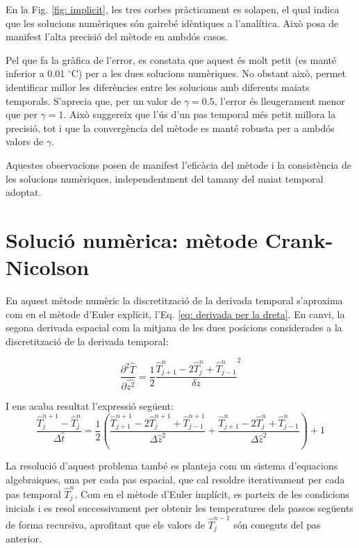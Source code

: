 \documentclass[11pt]{article}
\begin{document}
En la Fig. \ref{fig: implicit}, les tres corbes pràcticament es solapen, el qual indica que les solucions numèriques són gairebé idèntiques a l'analítica. Això posa de manifest l'alta precisió del mètode en ambdós casos.

Pel que fa la gràfica de l'error, es constata que aquest és molt petit (es manté inferior a 0.01 $^\circ$C) per a les dues solucions numèriques. No obstant això, permet identificar millor les diferències entre les solucions amb diferents maiats temporals. S'aprecia que, per un valor de $\gamma = 0.5$, l'error és lleugerament menor que per $\gamma = 1$. Això suggereix que l'ús d'un pas temporal més petit millora la precisió, tot i que la convergència del mètode es manté robusta per a ambdós valors de $\gamma$.

Aquestes observacions posen de manifest l'eficàcia del mètode i la consistència de les solucions numèriques, independentment del tamany del maiat temporal adoptat.


\section{Solució numèrica: mètode Crank-Nicolson}

En aquest mètode numèric la discretització de la derivada temporal s'aproxima com en el mètode d'Euler explícit, l'Eq. \eqref{eq: derivada per la dreta}. En canvi, la segona derivada espacial com la mitjana de les dues posicions considerades a la discretització de la derivada temporal:

\begin{equation}
    \frac{\partial^2\hat{T}}{\partial \hat{z^2}} = \frac{1}{2}\frac{\hat{T}_{j+1}^n-2\hat{T}_{j}^n+\hat{T}_{j-1}^n}{\delta z}^2
    \label{mitjana segones derivades espacials}
\end{equation}

I ens acaba resultat l'expressió següent:
\begin{equation}
    \frac{\hat{T}_j^{n+1}-\hat{T}_j^{n}}{\Delta\hat{t}} = {\frac{1}{2}}(\frac{\hat{T}_{j+1}^{n+1}-2\hat{T}_j^{n+1}+\hat{T}_{j-1}^{n+1}}{\Delta\hat{z}^2}+\frac{\hat{T}_{j+1}^{n}-2\hat{T}_j^{n}+\hat{T}_{j-1}^{n}}{\Delta\hat{z}^2}) + 1
    \label{discretitzacio crank-nicolson}
\end{equation}

La resolució d'aquest problema també es planteja com un sistema d'equacions algebraiques, una per cada pas espacial, que cal resoldre iterativament per cada pas temporal $\hat{T}_j^n$. Com en el mètode d'Euler implícit, es parteix de les condicions inicials i es resol successivament per obtenir les temperatures dels passos següents de forma recursiva, aprofitant que els valors de $\hat{T}_j^{n-1}$ són coneguts del pas anterior.
\end{document}
